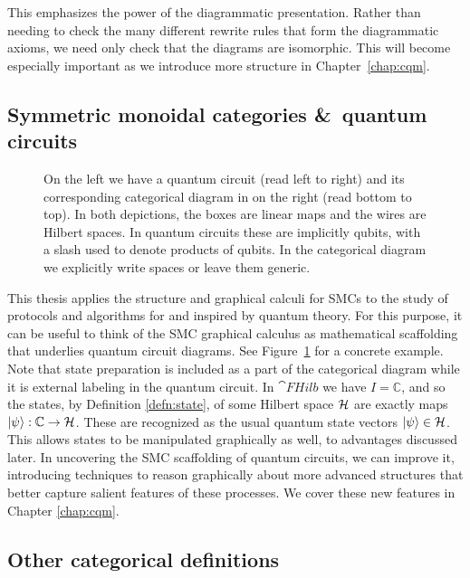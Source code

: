 \noindent This emphasizes the power of the diagrammatic presentation.  Rather than needing to check the many different rewrite rules that form the diagrammatic axioms, we need only check that the diagrams are isomorphic.  This will become especially important as we introduce more structure in Chapter~\ref{chap:cqm}.

\subsection{Symmetric monoidal categories \&\ quantum circuits}
\label{sec:smcqc}
\begin{figure}[t]

\caption[Comparison of quantum circuits and symmetric monoidal diagrams]{On the left we have a quantum circuit (read left to right) and its corresponding categorical diagram in  on the right (read bottom to top). In both depictions, the boxes are linear maps and the wires are Hilbert spaces. In quantum circuits these are implicitly qubits, with a slash used to denote products of qubits. In the categorical diagram we explicitly write spaces or leave them generic.}
\label{fig:QCDSMC}
\end{figure}

This thesis applies the structure and graphical calculi for SMCs to the study of protocols and algorithms for and inspired by quantum theory. For this purpose, it can be useful to think of the SMC graphical calculus as mathematical scaffolding that underlies quantum circuit diagrams. See Figure~\ref{fig:QCDSMC} for a concrete example. Note that state preparation is included as a part of the categorical diagram while it is external labeling in the quantum circuit. In $\cat{FHilb}$ we have $I=\mathbb{C}$, and so the states, by Definition \ref{defn:state}, of some Hilbert space $\mathcal{H}$ are exactly maps $| \psi \rangle:\mathbb{C}\to\mathcal{H}$. These are recognized as the usual quantum state vectors $| \psi \rangle\in\mathcal{H}$. This allows states to be manipulated graphically as well, to advantages discussed later. In uncovering the SMC scaffolding of quantum circuits, we can improve it, introducing techniques to reason graphically about more advanced structures that better capture salient features of these processes. We cover these new features in Chapter \ref{chap:cqm}.

\subsection{Other categorical definitions}

